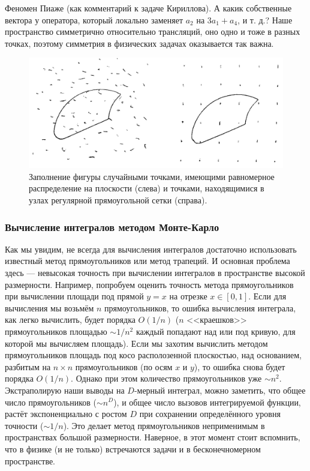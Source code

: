 \documentclass{book}
\begin{document}
Феномен Пиаже (как комментарий к задаче Кириллова). А какик собственные вектора у оператора,
который локально заменяет $a_2$ на $3 a_1 + a_4$, и т. д.? Наше пространство симметрично
относительно трансляций, оно одно и тоже в разных точках, поэтому симметрия в физических задачах
оказывается так важна.

\clearpage

\begin{figure}
	\includegraphics[width=1\linewidth]{dots-for-monte-carlo.png}
    \caption{\label{dots-for-monte-carlo}Заполнение фигуры случайными точками, имеющими равномерное
    распределение на плоскости (слева) и точками, находящимися в узлах регулярной прямоугольной
    сетки (справа).}
\end{figure}

\subsubsection{Вычисление интегралов методом Монте-Карло}

Как мы увидим, не всегда для вычисления интегралов достаточно использовать известный метод
прямоугольников или метод трапеций. И основная проблема здесь --- невысокая точность при вычислении
интегралов в пространстве высокой размерности. Например, попробуем оценить точность метода
прямоугольников при вычислении площади под прямой $y = x$ на отрезке $x \in [0, 1]$. Если для
вычисления мы возьмём $n$ прямоугольников, то ошибка вычисления интеграла, как легко вычислить,
будет порядка $O(1/n)$ ($n$ <<краешков>> прямоугольников площадью $\sim 1/n^2$ каждый попадают над
или под кривую, для которой мы вычисляем площадь). Если мы захотим вычислить методом
прямоугольников площадь под косо располозенной плоскостью, над основанием, разбитым на $n \times n$
прямоугольников (по осям $x$ и $y$), то ошибка снова будет порядка $O(1/n)$. Однако при этом
количество прямоугольников уже $\sim n^2$. Экстраполирую наши выводы на $D$-мерный интеграл, можно
заметить, что общее число прямоугольников ($\sim n^D$), и общее число вызовов интегрируемой
функции, растёт экспоненциально с ростом $D$ при сохранении определённого уровня точности ($\sim
1/n$). Это делает метод прямоугольников неприменимым в пространствах большой размерности. Наверное,
в этот момент стоит вспомнить, что в физике (и не только) встречаются задачи и в бесконечномерном
пространстве.
\end{document}
